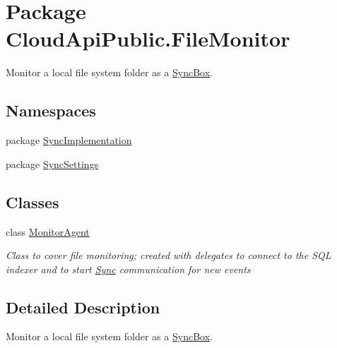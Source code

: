 \hypertarget{namespace_cloud_api_public_1_1_file_monitor}{\section{Package Cloud\-Api\-Public.\-File\-Monitor}
\label{namespace_cloud_api_public_1_1_file_monitor}
}


Monitor a local file system folder as a \hyperlink{class_cloud_api_public_1_1_sync_box}{Sync\-Box}.  


\subsection*{Namespaces}
\begin{DoxyCompactItemize}
\item 
package \hyperlink{namespace_cloud_api_public_1_1_file_monitor_1_1_sync_implementation}{Sync\-Implementation}
\item 
package \hyperlink{namespace_cloud_api_public_1_1_file_monitor_1_1_sync_settings}{Sync\-Settings}
\end{DoxyCompactItemize}
\subsection*{Classes}
\begin{DoxyCompactItemize}
\item 
class \hyperlink{class_cloud_api_public_1_1_file_monitor_1_1_monitor_agent}{Monitor\-Agent}
\begin{DoxyCompactList}\small\item\em Class to cover file monitoring; created with delegates to connect to the S\-Q\-L indexer and to start \hyperlink{namespace_cloud_api_public_1_1_sync}{Sync} communication for new events \end{DoxyCompactList}\end{DoxyCompactItemize}


\subsection{Detailed Description}
Monitor a local file system folder as a \hyperlink{class_cloud_api_public_1_1_sync_box}{Sync\-Box}. 